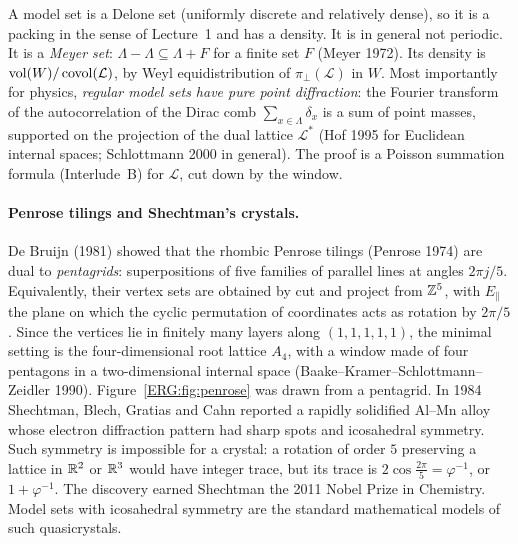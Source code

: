 A model set is a Delone set (uniformly discrete and relatively dense), so it is a packing in the sense of
Lecture~1 and has a density. It is in general not periodic. It is a \emph{Meyer set}:
$\Lambda-\Lambda\subseteq\Lambda+F$ for a finite set $F$ (Meyer 1972). Its density is
$\operatorname{vol}(W)/\operatorname{covol}(\mathcal L)$, by Weyl equidistribution of $\pi_\perp(\mathcal L)$ in $W$. Most importantly
for physics, \emph{regular model sets have pure point diffraction}: the Fourier transform of the
autocorrelation of the Dirac comb $\sum_{x\in\Lambda}\delta_x$ is a sum of point masses, supported on the
projection of the dual lattice $\mathcal L^*$ (Hof 1995 for Euclidean internal spaces; Schlottmann 2000
in general). The proof is a Poisson summation formula (Interlude~B) for $\mathcal L$, cut down by the
window.

\paragraph{Penrose tilings and Shechtman's crystals.} De Bruijn (1981) showed that the rhombic Penrose
tilings (Penrose 1974) are dual to \emph{pentagrids}: superpositions of five families of parallel lines
at angles $2\pi j/5$. Equivalently, their vertex sets are obtained by cut and project from $\mathbb{Z}^5$, with
$E_\parallel$ the plane on which the cyclic permutation of coordinates acts as rotation by $2\pi/5$. Since
the vertices lie in finitely many layers along $(1,1,1,1,1)$, the minimal setting is the
four-dimensional root lattice $A_4$, with a window made of four pentagons in a two-dimensional internal
space (Baake--Kramer--Schlottmann--Zeidler 1990). Figure~\ref{ERG:fig:penrose} was drawn from a
pentagrid. In 1984 Shechtman, Blech, Gratias and Cahn reported a rapidly
solidified Al--Mn alloy whose electron diffraction pattern had sharp spots and icosahedral symmetry. Such
symmetry is impossible for a crystal: a rotation of order $5$ preserving a lattice in $\mathbb{R}^2$ or $\mathbb{R}^3$
would have integer trace, but its trace is $2\cos\frac{2\pi}5=\varphi^{-1}$, or $1+\varphi^{-1}$. The
discovery earned Shechtman the 2011 Nobel Prize in Chemistry. Model sets with icosahedral symmetry are
the standard mathematical models of such quasicrystals.

